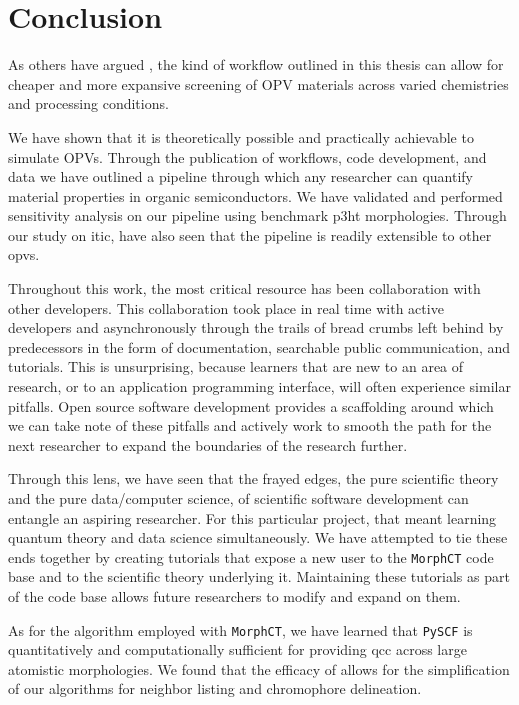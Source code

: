 \chapter{Conclusion}
\label{conclusion}

As others have argued \cite{Evans2016}\cite{Gali2017}\cite{Jones2017}, the kind of workflow outlined in this thesis
can allow for cheaper and more expansive screening of OPV materials across varied chemistries and processing
conditions. 

We have shown that it is theoretically possible and practically
achievable to simulate OPVs. 
Through the publication
of workflows, code development, and data we have outlined a 
pipeline through which any researcher can quantify material properties in
organic semiconductors. We have validated and performed sensitivity analysis on our pipeline using benchmark
\gls{p3ht} morphologies. Through our study on \gls{itic},  have also seen that the pipeline is readily
extensible to other \gls{opvs}.

Throughout this work, the most critical resource has been collaboration with
other developers. This collaboration took place in real time with active
developers and asynchronously through the trails of bread crumbs left behind
by predecessors in the form of documentation, searchable public communication,
and tutorials. This is unsurprising, because learners that are new to an area
of research, or to an application programming interface, will often experience
similar pitfalls. Open source software development provides a scaffolding
around which we can take note of these pitfalls and actively work to smooth the 
path for the next
researcher to expand the boundaries of the research further.

Through this lens, we have seen that the frayed edges, the pure
scientific theory and the pure data/computer science, of scientific software
development can entangle an aspiring researcher. For this particular project,
that meant learning quantum theory and data science simultaneously. We have
attempted to tie these ends together by creating tutorials that expose a new
user to the \texttt{MorphCT} code base and to the scientific theory
underlying it. Maintaining these tutorials as part of the code base allows
future researchers to modify and expand on them. 

As for the algorithm employed with \texttt{MorphCT}, we have learned that
\texttt{PySCF} is quantitatively and computationally sufficient for providing
\gls{qcc} across large atomistic morphologies. We found that the efficacy of
 allows for the simplification of our algorithms for neighbor
listing and chromophore delineation.  

